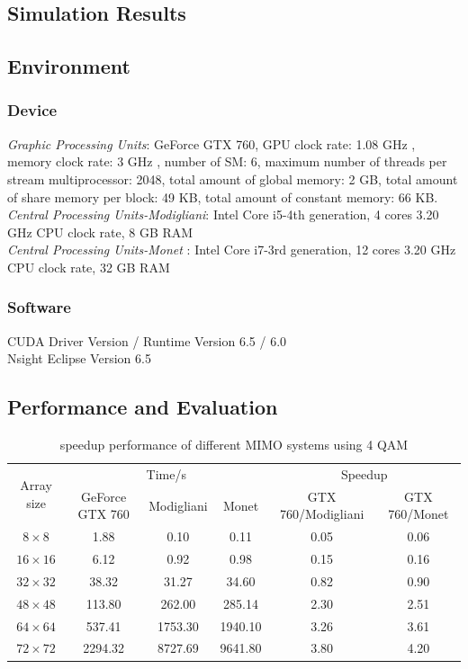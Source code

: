 \documentclass[12pt,a4paper,final]{article}
\begin{document}
\begin{spacing}{2.5}
\section{Simulation Results}\label{simulation}
\subsection{Environment}
\subsubsection{Device}
\emph{Graphic Processing Units}: GeForce GTX 760, GPU clock rate: 1.08 GHz , memory clock rate: 3 GHz , number of SM: 6, maximum number of threads per stream multiprocessor: 2048, total amount of global memory: 2 GB, total amount of share memory per block: 49 KB, total amount of constant memory: 66 KB. \\
\emph{Central Processing Units-Modigliani}: Intel Core i5-4th generation, 4 cores 3.20 GHz CPU clock rate, 8 GB RAM\\
\emph{Central Processing Units-Monet} : Intel Core i7-3rd generation, 12 cores 3.20 GHz CPU clock rate, 32 GB RAM
\subsubsection{Software}
CUDA Driver Version / Runtime Version      6.5 / 6.0\\
Nsight Eclipse Version 6.5
\subsection{Performance and Evaluation}
\begin{table}[htb]
\centering
\begin{tabular}{|c|c|c|c|c|c|}
\hline
\multirow{2}{*}{ Array size} & \multicolumn{3}{|c|}{Time/s} & \multicolumn{2}{|c|}{Speedup}\\
\cline{2-6}
&GeForce GTX 760 & Modigliani & Monet &  GTX 760/Modigliani  &  GTX 760/Monet \\
\hline
$8\times 8$& 1.88& 0.10&0.11 & 0.05& 0.06\\
\hline
$16\times 16$&6.12 & 0.92&0.98& 0.15& 0.16\\
\hline
$32\times 32$&38.32 & 31.27& 34.60& 0.82& 0.90\\
\hline
$48\times 48$&113.80& 262.00& 285.14& 2.30& 2.51\\
\hline
$64\times 64$& 537.41&1753.30&1940.10&3.26& 3.61 \\
\hline
$72\times 72 $&2294.32&8727.69 &9641.80 &3.80 &4.20 \\
\hline
\end{tabular}
\caption{speedup performance of different MIMO systems using 4 QAM}
\label{speedup1}
\end{table}




\end{spacing}
\end{document}

